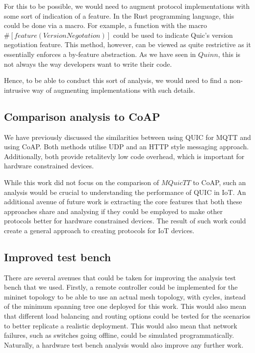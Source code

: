 For this to be possible, we would need to augment protocol implementations with some sort of indication of a feature.
In the Rust programming language, this could be done via a macro.
For example, a function with the macro $\#[feature(VersionNegotation)]$ could be used to indicate Quic's version negotiation feature.
This method, however, can be viewed as quite restrictive as it essentially enforces a by-feature abstraction.
As we have seen in $Quinn$, this is not always the way developers want to write their code.

Hence, to be able to conduct this sort of analysis, we would need to find a non-intrusive way of augmenting implementations with such details.

\subsection{Comparison analysis to CoAP}

We have previously discussed the similarities between using QUIC for MQTT and using CoAP.
Both methods utilise UDP and an HTTP style messaging approach.
Additionally, both provide retalitevly low code overhead, which is important for hardware constrained devices.

While this work did not focus on the comparison of $MQuicTT$ to CoAP, such an analysis would be crucial to understanding the performance of QUIC in IoT.
An additional avenue of future work is extracting the core features that both these approaches share and analysing if they could be employed to make other protocols better for hardware constrained devices.
The result of such work could create a general approach to creating protocols for IoT devices.

\subsection{Improved test bench}

There are several avenues that could be taken for improving the analysis test bench that we used.
Firstly, a remote controller could be implemented for the mininet topology to be able to use an actual mesh topology, with cycles, instead of the minimum spanning tree one deployed for this work.
This would also mean that different load balancing and routing options could be tested for the scenarios to better replicate a realistic deployment.
This would also mean that network failures, such as switches going offline, could be simulated programmatically.
Naturally, a hardware test bench analysis would also improve any further work.